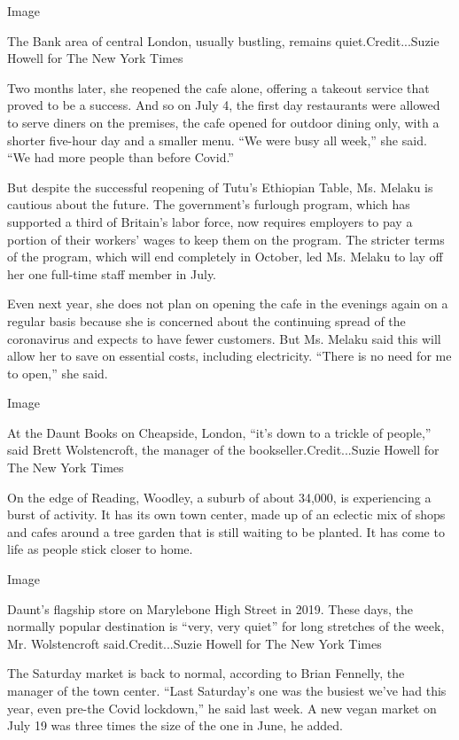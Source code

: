 Image

The Bank area of central London, usually bustling, remains
quiet.Credit...Suzie Howell for The New York Times

Two months later, she reopened the cafe alone, offering a takeout
service that proved to be a success. And so on July 4, the first day
restaurants were allowed to serve diners on the premises, the cafe
opened for outdoor dining only, with a shorter five-hour day and a
smaller menu. ``We were busy all week,'' she said. ``We had more people
than before Covid.''

But despite the successful reopening of Tutu's Ethiopian Table, Ms.
Melaku is cautious about the future. The government's furlough program,
which has supported a third of Britain's labor force, now requires
employers to pay a portion of their workers' wages to keep them on the
program. The stricter terms of the program, which will end completely in
October, led Ms. Melaku to lay off her one full-time staff member in
July.

Even next year, she does not plan on opening the cafe in the evenings
again on a regular basis because she is concerned about the continuing
spread of the coronavirus and expects to have fewer customers. But Ms.
Melaku said this will allow her to save on essential costs, including
electricity. ``There is no need for me to open,'' she said.

Image

At the Daunt Books on Cheapside, London, ``it's down to a trickle of
people,'' said Brett Wolstencroft, the manager of the
bookseller.Credit...Suzie Howell for The New York Times

On the edge of Reading, Woodley, a suburb of about 34,000, is
experiencing a burst of activity. It has its own town center, made up of
an eclectic mix of shops and cafes around a tree garden that is still
waiting to be planted. It has come to life as people stick closer to
home.

Image

Daunt's flagship store on Marylebone High Street in 2019. These days,
the normally popular destination is ``very, very quiet'' for long
stretches of the week, Mr. Wolstencroft said.Credit...Suzie Howell for
The New York Times

The Saturday market is back to normal, according to Brian Fennelly, the
manager of the town center. ``Last Saturday's one was the busiest we've
had this year, even pre-the Covid lockdown,'' he said last week. A new
vegan market on July 19 was three times the size of the one in June, he
added.

